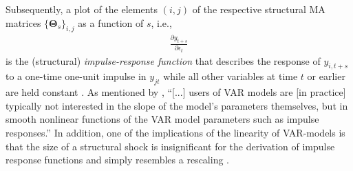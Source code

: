 \documentclass[a4paper,11pt,listof=nochaptergap,oneside,pointednumbers,bibtotoc,bigheadings,liststotoc,hidelinks]{scrbook}
\theoremstyle{mysatz}
\theoremstyle{mydefinition}
\theoremstyle{mytheorem}
\theoremstyle{mybemerkung}
\newcommand{\vect}[1]{\boldsymbol{\mathbf{#1}}}
\begin{document}
Subsequently, a plot of the elements $(i, j)$ of the respective structural MA matrices $\{\vect{\Theta}_s\}_{i, j}$ as a function of $s$, i.e., 
\begin{equation} \label{eq:svar10}
\begin{split}
 		\frac{\partial y_{t+s}}{\partial \epsilon_{t}}
\end{split}								
\end{equation}
is the (structural) \textit{impulse-response function} that describes the response of $y_{i, t+s}$ to a one-time one-unit impulse in $y_{jt}$ while all other variables at time $t$ or earlier are held constant \citep{rossi:11}. As mentioned by \citet[p. 37]{lutkepohlkilian:17}, ``[...] users of VAR models are [in practice] typically not interested in the slope of the model's parameters themselves, but in smooth nonlinear functions of the VAR model parameters such as impulse responses.'' In addition, one of the implications of the linearity of VAR-models is that the size of a structural shock is insignificant for the derivation of impulse response functions and simply resembles a rescaling \citep{lutkepohlkilian:17}.
\end{document}
